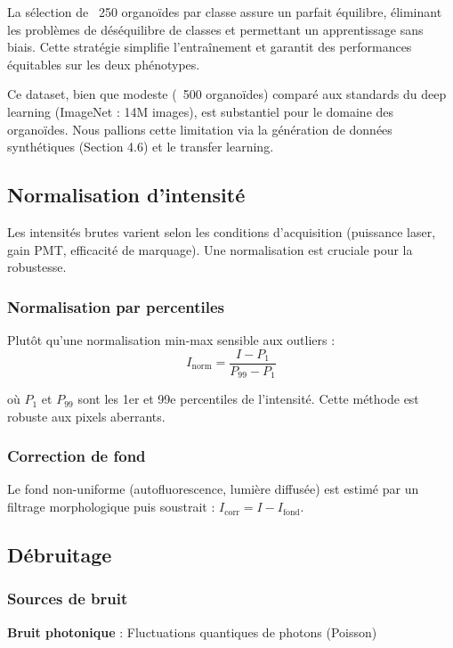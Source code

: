 La sélection de ~250 organoïdes par classe assure un parfait équilibre, éliminant les problèmes de déséquilibre de classes et permettant un apprentissage sans biais. Cette stratégie simplifie l'entraînement et garantit des performances équitables sur les deux phénotypes.

Ce dataset, bien que modeste (~500 organoïdes) comparé aux standards du deep learning (ImageNet : 14M images), est substantiel pour le domaine des organoïdes. Nous pallions cette limitation via la génération de données synthétiques (Section 4.6) et le transfer learning.

\subsection{Normalisation d'intensité}

Les intensités brutes varient selon les conditions d'acquisition (puissance laser, gain PMT, efficacité de marquage). Une normalisation est cruciale pour la robustesse.

\subsubsection{Normalisation par percentiles}

Plutôt qu'une normalisation min-max sensible aux outliers :
\[
I_{\text{norm}} = \frac{I - P_1}{P_{99} - P_1}
\]

où $P_1$ et $P_{99}$ sont les 1er et 99e percentiles de l'intensité. Cette méthode est robuste aux pixels aberrants.

\subsubsection{Correction de fond}

Le fond non-uniforme (autofluorescence, lumière diffusée) est estimé par un filtrage morphologique puis soustrait : $I_{\text{corr}} = I - I_{\text{fond}}$.

\subsection{Débruitage}

\subsubsection{Sources de bruit}

\textbf{Bruit photonique} : Fluctuations quantiques de photons (Poisson)

